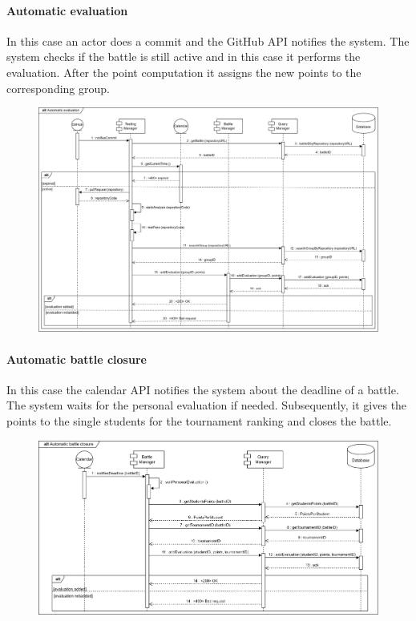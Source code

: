 \documentclass[12pt, a4paper]{report}
\begin{document}
    \paragraph*{Automatic evaluation}
    In this case an actor does a commit and the GitHub API notifies the system. 
    The system checks if the battle is still active and in this case it performs the evaluation. 
    After the point computation it assigns the new points to the corresponding group. 
    \begin{figure}[H]
        \centering
        \includegraphics[width=1.0\linewidth]{images/aerv.png}
    \end{figure}

    \paragraph*{Automatic battle closure}
    In this case the calendar API notifies the system about the deadline of a battle.
    The system waits for the personal evaluation if needed. 
    Subsequently, it gives the points to the single students for the tournament ranking and closes the battle. 
    \begin{figure}[H]
        \centering
        \includegraphics[width=1.0\linewidth]{images/abcrv.png}
    \end{figure}
\end{document}
